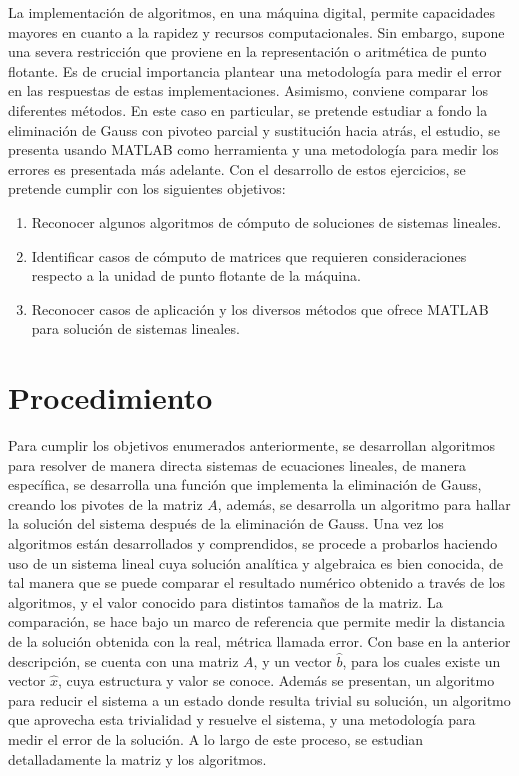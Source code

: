 \documentclass[11pt, spanish]{article}
\begin{document}
La implementación de algoritmos, en una máquina digital, permite capacidades mayores en cuanto a la rapidez y recursos computacionales. Sin embargo, supone una severa restricción que proviene en la representación o aritmética de punto flotante. Es de crucial importancia plantear una metodología para medir el error en las respuestas de estas implementaciones. Asimismo, conviene comparar los diferentes métodos. En este caso en particular, se pretende estudiar a fondo la eliminación de Gauss con pivoteo parcial y sustitución hacia atrás, el estudio, se presenta usando \textsc{MATLAB} como herramienta y una metodología para medir los errores es presentada más adelante. Con el desarrollo de estos ejercicios, se pretende cumplir con los siguientes objetivos:

\begin{enumerate}
\item Reconocer algunos algoritmos de cómputo de soluciones de sistemas lineales.
\item Identificar casos de cómputo de matrices que requieren consideraciones respecto a la unidad de punto flotante de la máquina.
\item Reconocer casos de aplicación y los diversos métodos que ofrece \textsc{MATLAB} para solución de sistemas lineales.
\end{enumerate}

\section{Procedimiento}

Para cumplir los objetivos enumerados anteriormente, se desarrollan algoritmos para resolver de manera directa sistemas de ecuaciones lineales, de manera específica, se desarrolla una función que implementa la eliminación de Gauss, creando los pivotes de la matriz $A$, además, se desarrolla un algoritmo para hallar la solución del sistema después de la eliminación de Gauss. Una vez los algoritmos están desarrollados y comprendidos, se procede a probarlos haciendo uso de un sistema lineal cuya solución analítica y algebraica es bien conocida, de tal manera que se puede comparar el resultado numérico obtenido a través de los algoritmos, y el valor conocido para distintos tamaños de la matriz. La comparación, se hace bajo un marco de referencia que permite medir la distancia de la solución obtenida con la real, métrica llamada error. Con base en la anterior descripción, se cuenta con una matriz $A$, y un vector $\hat{b}$, para los cuales existe un vector $\hat{x}$, cuya estructura y valor se conoce. Además se presentan, un algoritmo para reducir el sistema a un estado donde resulta trivial su solución, un algoritmo que aprovecha esta trivialidad y resuelve el sistema, y una metodología para medir el error de la solución. A lo largo de este proceso, se estudian detalladamente la matriz y los algoritmos. \\
\end{document}
